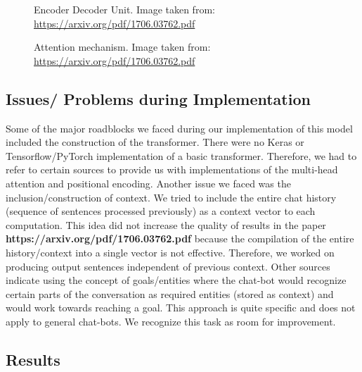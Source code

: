 \begin{figure}[ht!]
  \centering
  \begin{minipage}[b]{0.40\textwidth}
    \begin{center}
	\end{center}
    \caption{Encoder Decoder Unit. Image taken from: \url{https://arxiv.org/pdf/1706.03762.pdf}}
    \label{Fig. 1}
  \end{minipage}
  \hfill
  \begin{minipage}[b]{0.40\textwidth}
    \begin{center}
	\end{center}
    \caption{Attention mechanism. Image taken from: \url{https://arxiv.org/pdf/1706.03762.pdf}}
    \label{Fig. 2}
  \end{minipage}
\end{figure}

\subsection{Issues/ Problems during Implementation}
Some of the major roadblocks we faced during our implementation of this model included the construction of the transformer. There were no Keras or Tensorflow/PyTorch implementation of a basic transformer. Therefore, we had to refer to certain sources to provide us with implementations of the multi-head attention and positional encoding. Another issue we faced was the inclusion/construction of context. We tried to include the entire chat history (sequence of sentences processed previously) as a context vector to each computation. This idea did not increase the quality of results in the paper \textbf{https://arxiv.org/pdf/1706.03762.pdf} because the compilation of the entire history/context into a single vector is not effective. Therefore, we worked on producing output sentences independent of previous context. Other sources indicate using the concept of goals/entities where the chat-bot would recognize certain parts of the conversation as required entities (stored as context) and would work towards reaching a goal. This approach is quite specific and does not apply to general chat-bots. We recognize this task as room for improvement.

\subsection{Results}

